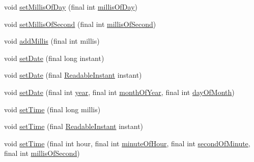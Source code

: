 \begin{DoxyCompactItemize}
\item 
void \hyperlink{classorg_1_1joda_1_1time_1_1_mutable_date_time_a673c7c58691f8d6e5782ef40b31aaa10}{set\-Millis\-Of\-Day} (final int \hyperlink{classorg_1_1joda_1_1time_1_1_mutable_date_time_ad7eee427801ea5a9d960c3459ba6e8c4}{millis\-Of\-Day})
\item 
void \hyperlink{classorg_1_1joda_1_1time_1_1_mutable_date_time_a2fd8272cd5f814d5762e2393ecc4a54f}{set\-Millis\-Of\-Second} (final int \hyperlink{classorg_1_1joda_1_1time_1_1_mutable_date_time_ac42752b6540827c2426fa9b5c48b0775}{millis\-Of\-Second})
\item 
void \hyperlink{classorg_1_1joda_1_1time_1_1_mutable_date_time_a12e2a304d16a0bb1e40c47ed2fe5a063}{add\-Millis} (final int millis)
\item 
void \hyperlink{classorg_1_1joda_1_1time_1_1_mutable_date_time_a09c340380a52f40a7e75f47452365dfa}{set\-Date} (final long instant)
\item 
void \hyperlink{classorg_1_1joda_1_1time_1_1_mutable_date_time_a411c42d4f8073a41ea9dfd07a1da37a9}{set\-Date} (final \hyperlink{interfaceorg_1_1joda_1_1time_1_1_readable_instant}{Readable\-Instant} instant)
\item 
void \hyperlink{classorg_1_1joda_1_1time_1_1_mutable_date_time_a96b47b61d1e75ac8e069696f4a497719}{set\-Date} (final int \hyperlink{classorg_1_1joda_1_1time_1_1_mutable_date_time_a33fe2fd92704573cfd1e0659cf26e0ae}{year}, final int \hyperlink{classorg_1_1joda_1_1time_1_1_mutable_date_time_a58a879bcc13ad752006977b73ccb01eb}{month\-Of\-Year}, final int \hyperlink{classorg_1_1joda_1_1time_1_1_mutable_date_time_a856f4c6ce8050846d320a4b88d7adcf4}{day\-Of\-Month})
\item 
void \hyperlink{classorg_1_1joda_1_1time_1_1_mutable_date_time_a05536895dbda34ada5f73baeec352ef9}{set\-Time} (final long millis)
\item 
void \hyperlink{classorg_1_1joda_1_1time_1_1_mutable_date_time_a70532b23ae836508531a28265f913647}{set\-Time} (final \hyperlink{interfaceorg_1_1joda_1_1time_1_1_readable_instant}{Readable\-Instant} instant)
\item 
void \hyperlink{classorg_1_1joda_1_1time_1_1_mutable_date_time_a75fe2887e73be25f5caafabd9a134536}{set\-Time} (final int hour, final int \hyperlink{classorg_1_1joda_1_1time_1_1_mutable_date_time_a30eda212c65711fde6149019836caebb}{minute\-Of\-Hour}, final int \hyperlink{classorg_1_1joda_1_1time_1_1_mutable_date_time_a2b00888de5a6e8cab5662bfe0ae4e9a9}{second\-Of\-Minute}, final int \hyperlink{classorg_1_1joda_1_1time_1_1_mutable_date_time_ac42752b6540827c2426fa9b5c48b0775}{millis\-Of\-Second})

\end{DoxyCompactItemize}
